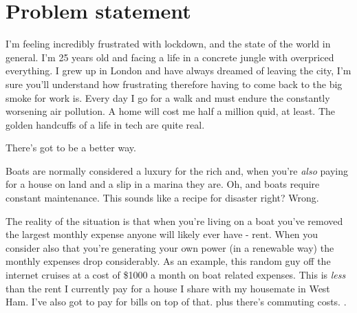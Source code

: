 \section{Problem statement}

I'm feeling incredibly frustrated with lockdown, and the state of the world in general. I'm 25 years old and facing a life in a concrete jungle with overpriced everything. I grew up in London and have always dreamed of leaving the city, I'm sure you'll understand how frustrating therefore having to come back to the big smoke for work is. Every day I go for a walk and must endure the constantly worsening air pollution. A home will cost me half a million quid, at least. The golden handcuffs of a life in tech are quite real.

There's got to be a better way.

Boats are normally considered a luxury for the rich and, when you're \textit{also} paying for a house on land and a slip in a marina they are. Oh, and boats require constant maintenance. This sounds like a recipe for disaster right? Wrong.

The reality of the situation is that when you're living on a boat you've removed the largest monthly expense anyone will likely ever have - rent. When you consider also that you're generating your own power (in a renewable way) the monthly expenses drop considerably. As an example, this random guy off the internet cruises at a cost of \$1000 a month on boat related expenses. This is \textit{less} than the rent I currently pay for a house I share with my housemate in West Ham. I've also got to pay for bills on top of that. plus there's commuting costs. \cite{sv-delos-budget}.

